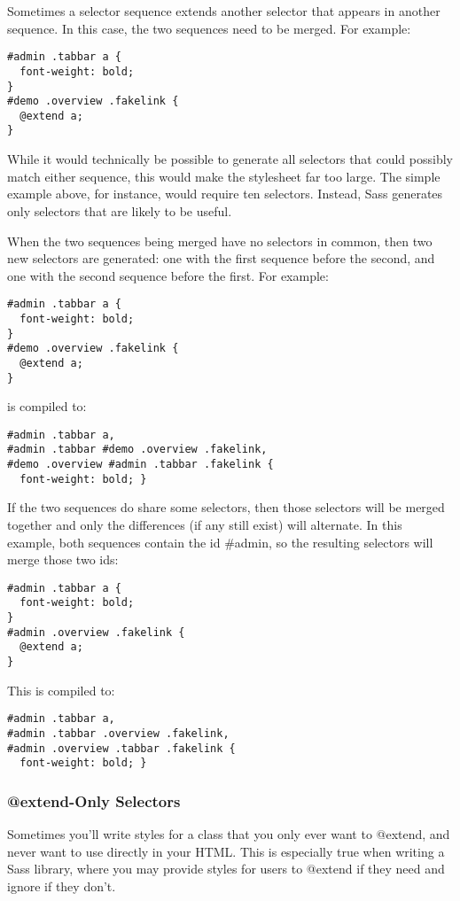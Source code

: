 \documentclass[9pt]{article}
\begin{document}
 Sometimes a selector sequence extends another selector that appears in another sequence. In this case, the two sequences need to be merged. For example:
\begin{verbatim}
#admin .tabbar a {
  font-weight: bold;
}
#demo .overview .fakelink {
  @extend a;
}
\end{verbatim}


 While it would technically be possible to generate all selectors that could possibly match either sequence, this would make the stylesheet far too large. The simple example above, for instance, would require ten selectors. Instead, Sass generates only selectors that are likely to be useful.


 When the two sequences being merged have no selectors in common, then two new selectors are generated: one with the first sequence before the second, and one with the second sequence before the first. For example:
\begin{verbatim}
#admin .tabbar a {
  font-weight: bold;
}
#demo .overview .fakelink {
  @extend a;
}
\end{verbatim}


 is compiled to:
\begin{verbatim}
#admin .tabbar a,
#admin .tabbar #demo .overview .fakelink,
#demo .overview #admin .tabbar .fakelink {
  font-weight: bold; }
\end{verbatim}


 If the two sequences do share some selectors, then those selectors will be merged together and only the differences (if any still exist) will alternate. In this example, both sequences contain the id \#admin, so the resulting selectors will merge those two ids:
\begin{verbatim}
#admin .tabbar a {
  font-weight: bold;
}
#admin .overview .fakelink {
  @extend a;
}
\end{verbatim}


 This is compiled to:
\begin{verbatim}
#admin .tabbar a,
#admin .tabbar .overview .fakelink,
#admin .overview .tabbar .fakelink {
  font-weight: bold; }
\end{verbatim}
\subsubsection{@extend-Only Selectors}


 Sometimes you’ll write styles for a class that you only ever want to @extend, and never want to use directly in your HTML. This is especially true when writing a Sass library, where you may provide styles for users to @extend if they need and ignore if they don’t.
\end{document}
